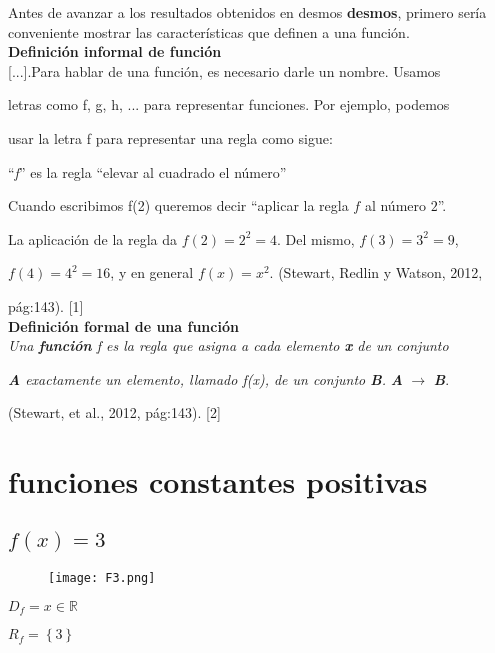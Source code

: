 \documentclass[12pt]{article}
\begin{document}
Antes de avanzar a los resultados obtenidos en desmos \textbf{{\green desmos}}, primero sería conveniente mostrar las características que definen a una función. \\

\textbf{Definición informal de función} \\

[...].Para hablar de una función, es necesario darle un nombre. Usamos \par letras como f, g, h, ... para representar funciones. Por ejemplo, podemos \par usar la letra f para representar una regla como sigue: 
\par
\begin{center}

``\textit{f}''  es la regla ``elevar al cuadrado el número''
\end{center}


Cuando escribimos f(2) queremos decir ``aplicar la regla $f$ al número $2$''.\par La aplicación de la regla da $f(2) = 2^2 = 4$. Del mismo, $f(3) = 3^2 = 9$, \par $f(4) = 4^2 = 16$, y en general $f(x) = x^2$. (Stewart, Redlin y Watson, 2012, \par pág:143). [1] \\

\textbf{{\blue Definición formal de una función}} \\

\textit{Una \textbf{función} \textit{f} es la regla que asigna a cada elemento \textbf{x} de un conjunto} \par \textit{\textbf{A} exactamente un elemento, llamado \textit{f(x}), de un conjunto \textbf{B}.} \textbf{\textit{A}} $\rightarrow$ \textbf{\textit{B}}. \par (Stewart, et al., 2012, pág:143). [2]

\newpage

\section{funciones \cyan constantes positivas}
\subsection{$f(x) = 3$}
\begin{figure}[htb] \centering \texttt{[image: F3.png]} \end{figure}
$D_f = x \in \mathbb{R}  $  \par
$R_f = \left\lbrace3\right\rbrace$ \\
\end{document}
